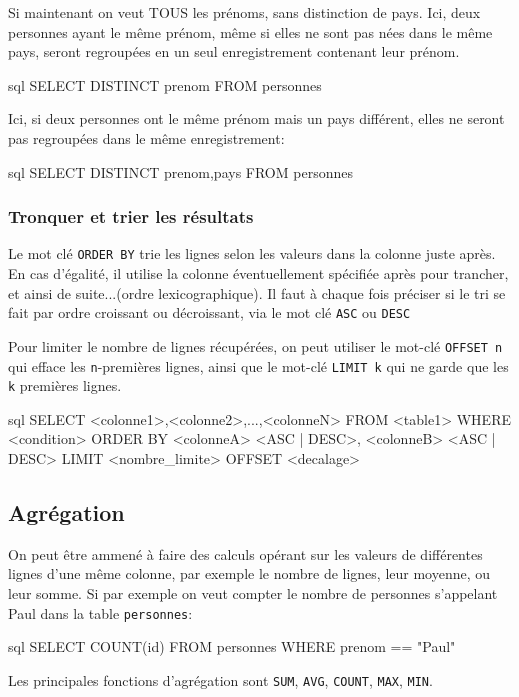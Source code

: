 \documentclass[a4paper]{scrartcl}
\begin{document}
				\exemple Si maintenant on veut TOUS les prénoms, sans distinction de pays. 
				Ici, deux personnes ayant le même prénom, même si elles ne sont pas nées dans le même pays, seront regroupées en un seul enregistrement contenant leur prénom.
				\begin{code}{sql}
					SELECT DISTINCT prenom
					FROM personnes
				\end{code}

				\exemple Ici, si deux personnes ont le même prénom mais un pays différent, elles ne seront pas regroupées dans le même enregistrement:
				\begin{code}{sql}
					SELECT DISTINCT prenom,pays
					FROM personnes
				\end{code}

			\subsubsection{Tronquer et trier les résultats}
				Le mot clé \texttt{ORDER BY} trie les lignes selon les valeurs dans la colonne juste après.
				En cas d'égalité, il utilise la colonne éventuellement spécifiée après pour trancher, et ainsi de suite...(ordre lexicographique).
				Il faut à chaque fois préciser si le tri se fait par ordre croissant ou décroissant, via le mot clé \texttt{ASC} ou \texttt{DESC}
				
				Pour limiter le nombre de lignes récupérées, on peut utiliser le mot-clé \texttt{OFFSET n} qui efface les \texttt{n}-premières lignes,
				ainsi que le mot-clé \texttt{LIMIT k} qui ne garde que les \texttt{k} premières lignes.

				\begin{code}{sql}
					SELECT <colonne1>,<colonne2>,...,<colonneN>
					FROM <table1>
					WHERE <condition>
					ORDER BY <colonneA> <ASC | DESC>, <colonneB> <ASC | DESC>
					LIMIT <nombre_limite>
					OFFSET <decalage>
				\end{code}

		\subsection{Agrégation}
			\semidef On peut être ammené à faire des calculs opérant sur les valeurs de différentes lignes d'une même colonne,
			par exemple le nombre de lignes, leur moyenne, ou leur somme.
			Si par exemple on veut compter le nombre de personnes s'appelant Paul dans la table \texttt{personnes}:			
			\begin{code}{sql}
				SELECT COUNT(id)
				FROM personnes
				WHERE prenom == "Paul"
			\end{code}
			Les principales fonctions d'agrégation sont \texttt{SUM}, \texttt{AVG}, \texttt{COUNT}, \texttt{MAX}, \texttt{MIN}.
\end{document}
